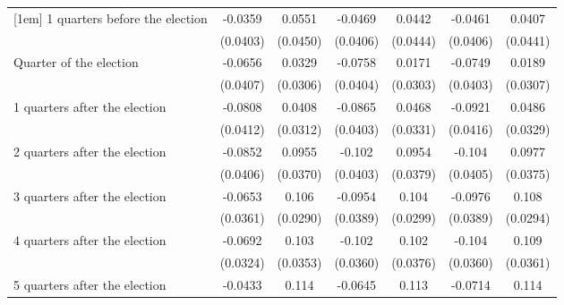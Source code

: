 \begin{table}[htbp]
\begin{tabular}{l*{6}{c}}
[1em]
 1 quarters before the election&     -0.0359         &      0.0551         &     -0.0469         &      0.0442         &     -0.0461         &      0.0407         \\
                    &    (0.0403)         &    (0.0450)         &    (0.0406)         &    (0.0444)         &    (0.0406)         &    (0.0441)         \\
[1em]
Quarter of the election&     -0.0656         &      0.0329         &     -0.0758         &      0.0171         &     -0.0749         &      0.0189         \\
                    &    (0.0407)         &    (0.0306)         &    (0.0404)         &    (0.0303)         &    (0.0403)         &    (0.0307)         \\
[1em]
 1 quarters after the election&     -0.0808\sym{*}  &      0.0408         &     -0.0865\sym{*}  &      0.0468         &     -0.0921\sym{*}  &      0.0486         \\
                    &    (0.0412)         &    (0.0312)         &    (0.0403)         &    (0.0331)         &    (0.0416)         &    (0.0329)         \\
[1em]
 2 quarters after the election&     -0.0852\sym{*}  &      0.0955\sym{**} &      -0.102\sym{*}  &      0.0954\sym{*}  &      -0.104\sym{*}  &      0.0977\sym{**} \\
                    &    (0.0406)         &    (0.0370)         &    (0.0403)         &    (0.0379)         &    (0.0405)         &    (0.0375)         \\
[1em]
 3 quarters after the election&     -0.0653         &       0.106\sym{***}&     -0.0954\sym{*}  &       0.104\sym{***}&     -0.0976\sym{*}  &       0.108\sym{***}\\
                    &    (0.0361)         &    (0.0290)         &    (0.0389)         &    (0.0299)         &    (0.0389)         &    (0.0294)         \\
[1em]
 4 quarters after the election&     -0.0692\sym{*}  &       0.103\sym{**} &      -0.102\sym{**} &       0.102\sym{**} &      -0.104\sym{**} &       0.109\sym{**} \\
                    &    (0.0324)         &    (0.0353)         &    (0.0360)         &    (0.0376)         &    (0.0360)         &    (0.0361)         \\
[1em]
 5 quarters after the election&     -0.0433         &       0.114\sym{***}&     -0.0645         &       0.113\sym{**} &     -0.0714\sym{*}  &       0.114\sym{**} \\

\end{tabular}
\end{table}
